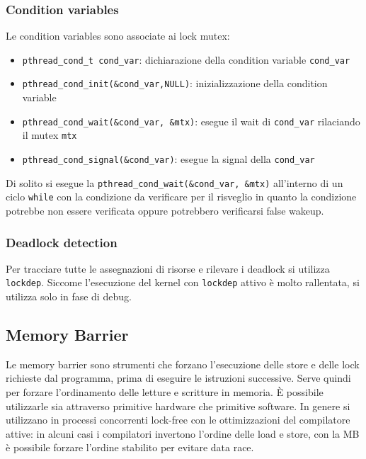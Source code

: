 \documentclass[a4paper]{article}
\begin{document}
\subsubsection*{Condition variables}
Le condition variables sono associate ai lock mutex:
\begin{itemize}
	\item \verb|pthread_cond_t cond_var|: dichiarazione della condition variable \verb|cond_var|
	\item \verb|pthread_cond_init(&cond_var,NULL)|: inizializzazione della condition variable
	\item \verb|pthread_cond_wait(&cond_var, &mtx)|: esegue il wait di \verb|cond_var| rilaciando il mutex \verb|mtx|
	\item \verb|pthread_cond_signal(&cond_var)|: esegue la signal della \verb|cond_var|
\end{itemize}
Di solito si esegue la \verb|pthread_cond_wait(&cond_var, &mtx)| all'interno di un ciclo \verb|while| con la condizione da
verificare per il risveglio in quanto la condizione potrebbe non essere verificata oppure potrebbero verificarsi false wakeup.

\subsubsection*{Deadlock detection}
Per tracciare tutte le assegnazioni di risorse e rilevare i deadlock si utilizza \verb|lockdep|. Siccome l'esecuzione del kernel
con \verb|lockdep| attivo è molto rallentata, si utilizza solo in fase di debug.


\subsection{Memory Barrier}
Le memory barrier sono strumenti che forzano l'esecuzione delle store e delle lock richieste dal programma, prima di eseguire
le istruzioni successive. Serve quindi per forzare l'ordinamento delle letture e scritture in memoria. È possibile utilizzarle
sia attraverso primitive hardware che primitive software. In genere si utilizzano in processi concorrenti lock-free con le
ottimizzazioni del compilatore attive: in alcuni casi i compilatori invertono l'ordine delle load e store, con la MB è possibile
forzare l'ordine stabilito per evitare data race.
\end{document}
